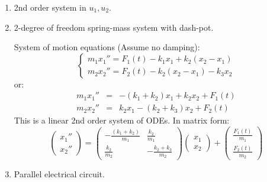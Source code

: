 \documentclass{article}
\begin{document}
\begin{enumerate}
  \item 2nd order system in $u_1, u_2$.
  
  \begin{center}
  \end{center}
  
  \item 2-degree of freedom spring-mass system with dash-pot.
  
  
  System of motion equations (Assume no damping):
  \[ \left\{\begin{array}{l}
       m_1 x_1'' = F_1 (t) - k_1 x_1 + k_2  (x_2 - x_1)\\
       m_2 x_2'' = F_2 (t) - k_2  (x_2 - x_1) - k_3 x_2
     \end{array}\right. \]
  or:
  \begin{eqnarray*}
    m_1 x_1'' & = & - (k_1 + k_2) x_1 + k_2 x_2 + F_1 (t)\\
    m_2 x_2'' & = & k_2 x_1 - (k_2 + k_3) x_2 + F_2 (t)
  \end{eqnarray*}
  This is a linear 2nd order system of ODEs. In matrix form:
  \[ \left(\begin{array}{c}
       x_1''\\
       x_2''
     \end{array}\right) = \left(\begin{array}{cc}
       - \frac{(k_1 + k_2)}{m_1} & \frac{k_2}{m_1}\\
       \frac{k_2}{m_2} & - \frac{k_2 + k_3}{m_2}
     \end{array}\right) \left(\begin{array}{c}
       x_1\\
       x_2
     \end{array}\right) + \left(\begin{array}{c}
       \frac{F_1 (t)}{m_1}\\
       \frac{F_2 (t)}{m_2}
     \end{array}\right) \]
  \item Parallel electrical circuit.
  

\end{enumerate}
\end{document}
